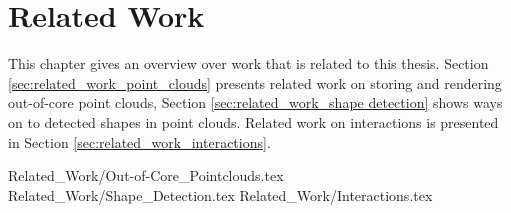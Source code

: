 \chapter {Related Work}
\label{chap:related_work}

This chapter gives an overview over work that is related to this thesis. Section \ref{sec:related_work_point_clouds} presents related work on storing and rendering out-of-core point clouds, Section \ref{sec:related_work_shape detection} shows ways on to detected shapes in point clouds. Related work on interactions is presented in Section \ref{sec:related_work_interactions}. 

 {Related_Work/Out-of-Core_Pointclouds.tex}
 {Related_Work/Shape_Detection.tex}
 {Related_Work/Interactions.tex}